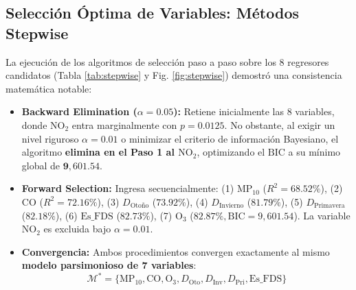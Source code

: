 \documentclass[10pt,twocolumn,a4paper]{article}
\begin{document}
\subsection{Selección Óptima de Variables: Métodos Stepwise}
La ejecución de los algoritmos de selección paso a paso sobre los $8$ regresores candidatos (Tabla \ref{tab:stepwise} y Fig. \ref{fig:stepwise}) demostró una consistencia matemática notable:
\begin{itemize}
    \item \textbf{Backward Elimination ($\alpha = 0.05$):} Retiene inicialmente las $8$ variables, donde $\text{NO}_2$ entra marginalmente con $p = 0.0125$. No obstante, al exigir un nivel riguroso $\alpha = 0.01$ o minimizar el criterio de información Bayesiano, el algoritmo \textbf{elimina en el Paso 1 al $\text{NO}_2$}, optimizando el $\text{BIC}$ a su mínimo global de $\mathbf{9,601.54}$.
    \item \textbf{Forward Selection:} Ingresa secuencialmente: (1) $\text{MP}_{10}$ ($R^2 = 68.52\%$), (2) $\text{CO}$ ($R^2 = 72.16\%$), (3) $D_{\text{Otoño}}$ ($73.92\%$), (4) $D_{\text{Invierno}}$ ($81.79\%$), (5) $D_{\text{Primavera}}$ ($82.18\%$), (6) $\text{Es\_FDS}$ ($82.73\%$), (7) $\text{O}_3$ ($82.87\%, \text{BIC} = 9,601.54$). La variable $\text{NO}_2$ es excluida bajo $\alpha = 0.01$.
    \item \textbf{Convergencia:} Ambos procedimientos convergen exactamente al mismo \textbf{modelo parsimonioso de 7 variables}:
    \begin{equation}
        \mathcal{M}^* = \{\text{MP}_{10}, \text{CO}, \text{O}_3, D_{\text{Oto}}, D_{\text{Inv}}, D_{\text{Pri}}, \text{Es\_FDS}\}
    \end{equation}
\end{itemize}

\begin{table}[h]
\centering
\caption{Comparación de modelos por selección Stepwise ($n = 3,185$).}
\label{tab:stepwise}
\vspace{-0.2cm}
\end{table}
\end{document}

